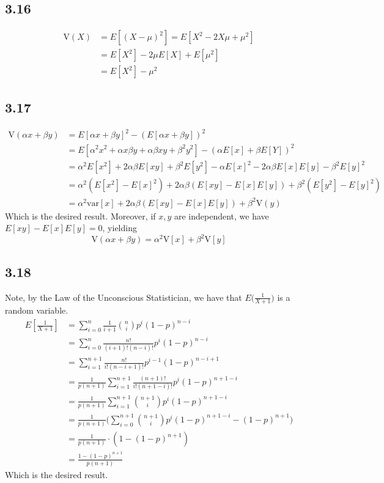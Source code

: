 \documentclass[letterpaper,12pt]{article}
\theoremstyle{definition}
\begin{document}
\subsection*{3.16}
\begin{align*}
    \text{V}(X) & = E[(X-\mu)^2] = E[X^2 - 2X\mu + \mu^2] \\
    & = E[X^2] - 2\mu E[X] + E[\mu^2]\\
    & = E[X^2] - \mu^2
\end{align*}

\subsection*{3.17}
\begin{align*}
    \text{V}(\alpha x + \beta y) & = E [\alpha x + \beta y]^2 - (E[\alpha x + \beta y] )^2 \\
    & = E[\alpha^2 x^2 + \alpha x \beta y + \alpha \beta xy + \beta^2 y^2] - (\alpha E[x] + \beta E[Y])^2 \\
    & = \alpha^2 E[x^2] + 2\alpha \beta E[xy] + \beta ^2 E[y^2] - \alpha E[x]^2 - 2 \alpha \beta E[x]E[y] - \beta ^2 E[y]^2 \\
    & = \alpha ^2 (E[x^2]-E[x]^2) + 2\alpha \beta (E[xy]-E[x]E[y]) + \beta^2(E[y^2]-E[y]^2) \\
    & = \alpha^2 \text{var}[x] + 2\alpha \beta(E[xy]-E[x]E[y])+\beta^2 \text{V}(y)
\end{align*}
Which is the desired result. Moreover, if $x,y$ are independent, we have $E[xy]-E[x]E[y]= 0$, yielding
\[
    \text{V}(\alpha x + \beta y) = \alpha^2 \text{V}[x] +\beta^2 \text{V}[y]
\]


\subsection*{3.18}
Note, by the Law of the Unconscious Statistician, we have that $E\big(\frac{1}{X+1}\big)$ is a random variable.
\begin{align*}
    E\left[\frac{1}{X+1}\right] & = \sum_{i=0}^n \frac{1}{i+1} \binom ni p^i (1-p)^{n-i} \\
    & = \sum_{i=0}^n \frac{n!}{(i+1)!(n-i)!}  p^i (1-p)^{n-i} \\
    & = \sum_{i=1}^{n+1} \frac{n!}{i!(n-i+1)!} p^{i-1} (1-p)^{n-i+1}\\
    & = \frac{1}{p(n+1)} \sum_{i=1}^{n+1} \frac{(n+1)!}{i!(n+1-i)!} p^{i} (1-p)^{n+1-i} \\
    & = \frac{1}{p(n+1)} \sum_{i=1}^{n+1} \binom {n+1}i p^{i} (1-p)^{n+1-i} \\
    & = \frac{1}{p(n+1)} \big(\sum_{i=0}^{n+1} \binom {n+1}i p^{i} (1-p)^{n+1-i}-(1-p)^{n+1}\big) \\
    & = \frac{1}{p(n+1)}\cdot (1-(1-p)^{n+1}) \\
    & = \frac{1-(1-p)^{n+1}}{p(n+1)} 
\end{align*}
Which is the desired result.
\end{document}
